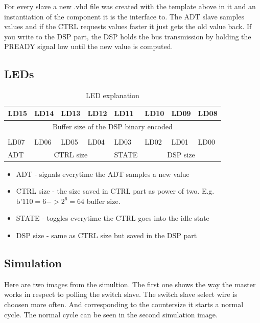 For every slave a new .vhd file was created with the template above in it and an 
instantiation of the component it is the interface to. The ADT slave samples values
and if the CTRL requests values faster it just gets the old value back. If you write
to the DSP part, the DSP holds the bus transmission by holding the PREADY signal low
until the new value is computed.

\subsection{LEDs}
\begin{table}[ht]
    \centering
    \begin{tabular}{|l|l|l|l|l|l|l|l|}
        \hline
         LD15 & LD14 & LD13 & LD12 & LD11 & LD10 & LD09 & LD08 \\ \hline
         \multicolumn{8}{|c|}{Buffer size of the DSP binary encoded} \\ \hline
         \multicolumn{8}{c}{} \\ \hline
         LD07 & LD06 & LD05 & LD04 & LD03 & LD02 & LD01 & LD00 \\ \hline
         ADT & \multicolumn{3}{c|}{CTRL size} & STATE & \multicolumn{3}{c|}{DSP size} \\ \hline
    \end{tabular}
    \caption{LED explanation}
    \label{tab:leds}
\end{table}

\begin{itemize}
    \item ADT - signals everytime the ADT samples a new value
    \item CTRL size - the size saved in CTRL part as power of two. 
        E.g. $\text{b'}1 1 0 = 6 -> 2^6 = 64$ buffer size.
    \item STATE - toggles everytime the CTRL goes into the idle state
    \item DSP size - same as CTRL size but saved in the DSP part
\end{itemize}

\subsection{Simulation}
Here are two images from the simultion. The first one shows the way
the master works in respect to polling the switch slave. The switch
slave select wire is choosen more often. And corresponding to the 
countersize it starts a normal cycle. The normal cycle can be seen in 
the second simulation image.
\newpage

